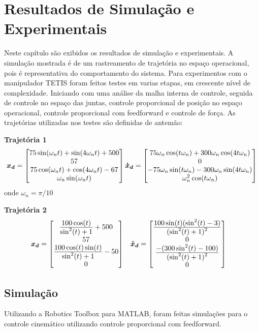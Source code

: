 \chapter{Resultados de Simulação e Experimentais}

Neste capítulo são exibidos os resultados de simulação e experimentais. A simulação mostrada é de um rastreamento de trajetória no espaço operacional, pois é representativa do comportamento do sistema. Para experimentos com o manipulador TETIS foram feitos testes em varias etapas, em crescente nível de complexidade. Iniciando com uma análise da malha interna de controle, seguida de controle no espaço das juntas, controle proporcional de posição no espaço operacional, controle proporcional com feedforward e controle de força. As trajetórias utilizadas nos testes são definidas de antemão:

\textbf{Trajetória 1}
\begin{gather}
\bm{x_d} = \begin{bmatrix}75 \sin(\omega_n t) + \sin (4 \omega_n t) + 500 \\ 57 \\ 75 \cos(\omega_n t) + \cos(4\omega_n t) -67 \\ \omega_n \sin(\omega_nt) \end{bmatrix}
\bm{\dot{x}_d} = \begin{bmatrix}75\omega_n \cos(t\omega_n) + 300 \omega_n \cos(4t\omega_n) \\
0 \\
-75 \omega_n \sin(t \omega_n) - 300 \omega_n \sin(4t\omega_n) \\
\omega_n^2 \cos(t \omega_n)\end{bmatrix}
\end{gather}
onde $\omega_n = \pi/10$

\textbf{Trajetória 2}
\begin{align}
\bm{x_d} &= \begin{bmatrix} 
\frac{\displaystyle 100 \cos(t)}{\displaystyle \sin^2(t) + 1} + 500 \\
57 \\
\frac{\displaystyle 100\cos(t) \sin(t)}{\displaystyle \sin^2(t) + 1} -50 \\
0
\end{bmatrix} &&
\bm{\dot{x}_d} = \begin{bmatrix}
\frac{\displaystyle 100\sin(t) (\sin^2(t) -3 )}{\displaystyle (\sin^2(t) + 1)^2} \\
0 \\
\frac{\displaystyle -(300 \sin^2(t) - 100)}{\displaystyle (\sin^2(t) + 1)^2} \\
0\end{bmatrix}
\end{align}

\section{Simulação}
Utilizando a Robotics Toolbox \citep{petercorke} para MATLAB\circledR , foram feitas simulações para o controle cinemático utilizando controle proporcional com feedforward.

